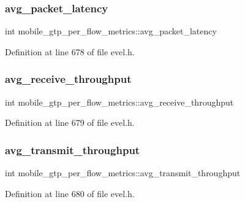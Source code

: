 \subsubsection{\texorpdfstring{avg\+\_\+packet\+\_\+latency}{avg\_packet\_latency}}
{\footnotesize\ttfamily int mobile\+\_\+gtp\+\_\+per\+\_\+flow\+\_\+metrics\+::avg\+\_\+packet\+\_\+latency}



Definition at line 678 of file evel.\+h.

\hypertarget{structmobile__gtp__per__flow__metrics_a4ac7fad1fea3845695d6491cb13d0187}{}\label{structmobile__gtp__per__flow__metrics_a4ac7fad1fea3845695d6491cb13d0187} 
\subsubsection{\texorpdfstring{avg\+\_\+receive\+\_\+throughput}{avg\_receive\_throughput}}
{\footnotesize\ttfamily int mobile\+\_\+gtp\+\_\+per\+\_\+flow\+\_\+metrics\+::avg\+\_\+receive\+\_\+throughput}



Definition at line 679 of file evel.\+h.

\hypertarget{structmobile__gtp__per__flow__metrics_a1405e6a71611fa80ad366cb44f7fd0e1}{}\label{structmobile__gtp__per__flow__metrics_a1405e6a71611fa80ad366cb44f7fd0e1} 
\subsubsection{\texorpdfstring{avg\+\_\+transmit\+\_\+throughput}{avg\_transmit\_throughput}}
{\footnotesize\ttfamily int mobile\+\_\+gtp\+\_\+per\+\_\+flow\+\_\+metrics\+::avg\+\_\+transmit\+\_\+throughput}



Definition at line 680 of file evel.\+h.

